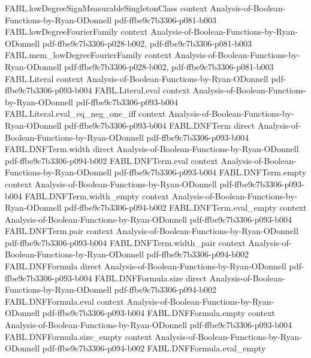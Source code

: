 \begin{theorem}
\proofstep
  {FABL.lowDegreeSignMeasurableSingletonClass}
  {context}
  {Analysis-of-Boolean-Functions-by-Ryan-ODonnell}
  {pdf-ffbe9c7b3306-p081-b003}
\proofstep
  {FABL.lowDegreeFourierFamily}
  {context}
  {Analysis-of-Boolean-Functions-by-Ryan-ODonnell}
  {pdf-ffbe9c7b3306-p028-b002,
    pdf-ffbe9c7b3306-p081-b003}
\proofstep
  {FABL.mem_lowDegreeFourierFamily}
  {context}
  {Analysis-of-Boolean-Functions-by-Ryan-ODonnell}
  {pdf-ffbe9c7b3306-p028-b002,
    pdf-ffbe9c7b3306-p081-b003}
\proofstep
  {FABL.Literal}
  {context}
  {Analysis-of-Boolean-Functions-by-Ryan-ODonnell}
  {pdf-ffbe9c7b3306-p093-b004}
\proofstep
  {FABL.Literal.eval}
  {context}
  {Analysis-of-Boolean-Functions-by-Ryan-ODonnell}
  {pdf-ffbe9c7b3306-p093-b004}
\proofstep
  {FABL.Literal.eval_eq_neg_one_iff}
  {context}
  {Analysis-of-Boolean-Functions-by-Ryan-ODonnell}
  {pdf-ffbe9c7b3306-p093-b004}
\proofstep
  {FABL.DNFTerm}
  {direct}
  {Analysis-of-Boolean-Functions-by-Ryan-ODonnell}
  {pdf-ffbe9c7b3306-p093-b004}
\proofstep
  {FABL.DNFTerm.width}
  {direct}
  {Analysis-of-Boolean-Functions-by-Ryan-ODonnell}
  {pdf-ffbe9c7b3306-p094-b002}
\proofstep
  {FABL.DNFTerm.eval}
  {context}
  {Analysis-of-Boolean-Functions-by-Ryan-ODonnell}
  {pdf-ffbe9c7b3306-p093-b004}
\proofstep
  {FABL.DNFTerm.empty}
  {context}
  {Analysis-of-Boolean-Functions-by-Ryan-ODonnell}
  {pdf-ffbe9c7b3306-p093-b004}
\proofstep
  {FABL.DNFTerm.width_empty}
  {context}
  {Analysis-of-Boolean-Functions-by-Ryan-ODonnell}
  {pdf-ffbe9c7b3306-p094-b002}
\proofstep
  {FABL.DNFTerm.eval_empty}
  {context}
  {Analysis-of-Boolean-Functions-by-Ryan-ODonnell}
  {pdf-ffbe9c7b3306-p093-b004}
\proofstep
  {FABL.DNFTerm.pair}
  {context}
  {Analysis-of-Boolean-Functions-by-Ryan-ODonnell}
  {pdf-ffbe9c7b3306-p093-b004}
\proofstep
  {FABL.DNFTerm.width_pair}
  {context}
  {Analysis-of-Boolean-Functions-by-Ryan-ODonnell}
  {pdf-ffbe9c7b3306-p094-b002}
\proofstep
  {FABL.DNFFormula}
  {direct}
  {Analysis-of-Boolean-Functions-by-Ryan-ODonnell}
  {pdf-ffbe9c7b3306-p093-b004}
\proofstep
  {FABL.DNFFormula.size}
  {direct}
  {Analysis-of-Boolean-Functions-by-Ryan-ODonnell}
  {pdf-ffbe9c7b3306-p094-b002}
\proofstep
  {FABL.DNFFormula.eval}
  {context}
  {Analysis-of-Boolean-Functions-by-Ryan-ODonnell}
  {pdf-ffbe9c7b3306-p093-b004}
\proofstep
  {FABL.DNFFormula.empty}
  {context}
  {Analysis-of-Boolean-Functions-by-Ryan-ODonnell}
  {pdf-ffbe9c7b3306-p093-b004}
\proofstep
  {FABL.DNFFormula.size_empty}
  {context}
  {Analysis-of-Boolean-Functions-by-Ryan-ODonnell}
  {pdf-ffbe9c7b3306-p094-b002}
\proofstep
  {FABL.DNFFormula.eval_empty}

\end{theorem}
